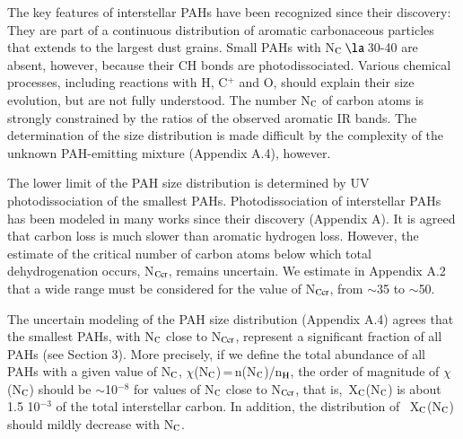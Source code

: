 \documentclass{aa}
\begin{document}
The key features of interstellar PAHs have been recognized since their discovery: They are part of a continuous distribution of aromatic carbonaceous particles that extends to the largest dust grains. Small PAHs with N$_{\rm C}$\,$\la$\,30-40 are absent, however, because their CH bonds are photodissociated. Various chemical processes, including reactions with H, C$^+$ and O, should explain their size evolution, but are not fully understood. 
 The number N$_{\rm C}$ of carbon atoms is strongly constrained by the ratios of the observed aromatic IR bands. 
The determination of the size distribution is made difficult by the complexity of the unknown PAH-emitting mixture (Appendix A.4), however.

The lower limit of the PAH size distribution is determined by UV photodissociation of the smallest PAHs. 
Photodissociation of interstellar PAHs has been modeled in many works since their discovery (Appendix A). It is agreed that carbon loss is much slower than aromatic
hydrogen loss. However, 
the estimate of the critical number of carbon atoms  below which total dehydrogenation occurs, N$_{\rm Ccr}$,  remains uncertain.  
We estimate in Appendix A.2 that a wide range must be considered for 
the value of N$_{\rm Ccr}$, from $\sim$35 to $\sim$50.
  
The uncertain modeling of the PAH size distribution (Appendix A.4)  agrees that the smallest PAHs, with N$_{\rm C}$ close to  N$_{\rm Ccr}$, represent a significant fraction of all PAHs (see Section 3). More precisely, 
if we define the total abundance of all PAHs with a given value of N$_{\rm C}$, $\chi$(N$_{\rm C}$)\,=\,n(N$_{\rm C}$)/n$_{\rm H}$, the order of 
magnitude of $\chi$(N$_{\rm C}$) should be $\sim$10$^{-8}$ for 
values of N$_{\rm C}$ close to N$_{\rm Ccr}$, that is,\ X$_{\rm C}$(N$_{\rm C}$) is about 1.5 10$^{-3}$ of the total interstellar carbon. In addition, 
the distribution of \ X$_{\rm C}$(N$_{\rm C}$)  should mildly decrease with N$_{\rm C}$.
\end{document}
